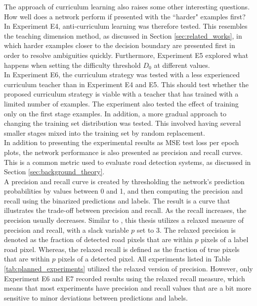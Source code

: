 The approach of curriculum learning also raises some other interesting questions. How well does a network perform if presented with the ``harder" examples first? In Experiment E4, anti-curriculum learning was therefore tested. This resembles the teaching dimension method, as discussed in Section \ref{sec:related_works}, in which harder examples closer to the decision boundary are presented first in order to resolve ambiguities quickly. Furthermore, Experiment E5 explored what happens when setting the difficulty threshold $D_0$ at different values.\\

In Experiment E6, the curriculum strategy was tested with a less experienced curriculum teacher than in Experiment E4 and E5. This should test whether the proposed curriculum strategy is viable with a teacher that has trained with a limited number of examples. The experiment also tested the effect of training only on the first stage examples. In addition, a more gradual approach to changing the training set distribution was tested. This involved having several smaller stages mixed into the training set by random replacement.\\

In addition to presenting the experimental results as \ac{MSE} test loss per epoch plots, the network performance is also presented as precision and recall curves. This is a common metric used to evaluate road detection systems, as discussed in Section \ref{sec:background_theory}.\\

A precision and recall curve is created by thresholding the network's prediction probabilities by values between 0 and 1, and then computing the precision and recall using the binarized predictions and labels. The result is a curve that illustrates the trade-off between precision and recall. As the recall increases, the precision usually decreases. Similar to \citep{Mnih_aerial_images_noisy}, this thesis utilizes a relaxed measure of precision and recall, with a slack variable $p$ set to 3. The relaxed precision is denoted as the fraction of detected road pixels that are within $p$ pixels of a label road pixel. Whereas, the relaxed recall is defined as the fraction of true pixels that are within $p$ pixels of a detected pixel. All experiments listed in Table \ref{tab:planned_experiments} utilized the relaxed version of precision. However, only Experiment E6 and E7 recorded results using the relaxed recall measure, which means that most experiments have precision and recall values that are a bit more sensitive to minor deviations between predictions and labels.\\

